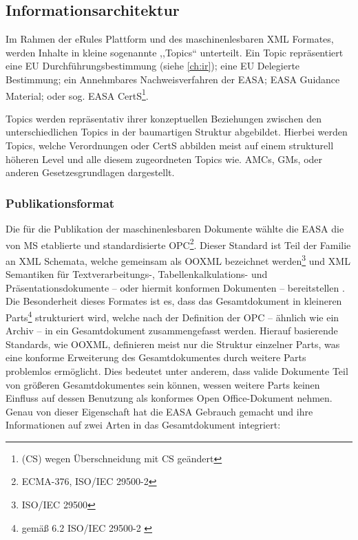 \subsection{Informationsarchitektur}
\label{ch:easa_arch}

    Im Rahmen der eRules Plattform und des maschinenlesbaren \ac{XML} Formates, werden Inhalte in kleine sogenannte ,,Topics`` unterteilt.
    Ein Topic repräsentiert eine \ac{EU} Durchführungsbestimmung (siehe \ref{ch:ir}); eine \ac{EU} Delegierte Bestimmung; ein Annehmbares Nachweisverfahren der \ac{EASA}; \ac{EASA} Guidance Material; oder sog. \ac{EASA} \acf{CertS}\footnote{(CS) wegen Überschneidung mit \acf{CS} geändert}. \cite[S. 5f]{easa_xml_doc}

    \medskip
    Topics werden repräsentativ ihrer konzeptuellen Beziehungen zwischen den unterschiedlichen Topics in der baumartigen Struktur abgebildet.
    Hierbei werden Topics, welche Verordnungen oder \ac{CertS} abbilden meist auf einem strukturell höheren Level und alle diesem zugeordneten Topics wie. \acsp{AMC}, \acsp{GM}, oder anderen Gesetzesgrundlagen dargestellt.
    
        
\subsubsection{Publikationsformat}

    Die für die Publikation der maschinenlesbaren Dokumente wählte die \ac{EASA} die von \acf{MS} etablierte und standardisierte \acf{OPC}\footnote{\acs{ECMA}-376, ISO/IEC 29500-2}.
    Dieser Standard ist Teil der Familie an \ac{XML} Schemata, welche gemeinsam als \acf{OOXML} bezeichnet werden\footnote{ ISO/IEC 29500} und \ac{XML} Semantiken für Textverarbeitungs-, Tabellen\-kal\-ku\-lations- und Präsentationsdokumente -- oder hiermit konformen Dokumenten -- bereitstellen
    \cite[vii]{easa_opc_iso}. 
    Die Besonderheit dieses Formates ist es, dass das Gesamtdokument in kleineren Parts\footnote{gemäß 6.2 ISO/IEC 29500-2 \cite{easa_opc_iso}} strukturiert wird, welche nach der Definition der \ac{OPC} -- ähnlich wie ein Archiv -- in ein Gesamtdokument zusammengefasst werden.
    Hierauf basierende Standards, wie \ac{OOXML}, definieren meist nur die Struktur einzelner Parts, was eine konforme Erweiterung des Gesamtdokumentes durch weitere Parts problemlos ermöglicht.   
    Dies bedeutet unter anderem, dass valide Dokumente Teil von größeren Gesamtdokumentes sein können, wessen weitere Parts keinen Einfluss auf dessen Benutzung als konformes Open Office-Dokument nehmen.
    Genau von dieser Eigenschaft hat die \ac{EASA} Gebrauch gemacht und ihre Informationen auf zwei Arten in das Gesamtdokument integriert:

